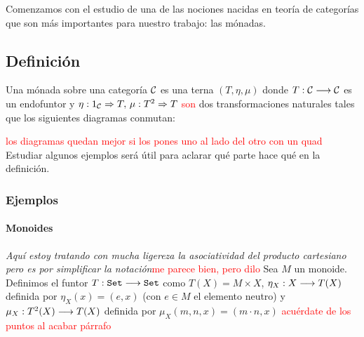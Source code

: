 Comenzamos con el estudio de una de las nociones nacidas
en teoría de categorías que son
más importantes para nuestro trabajo: las mónadas.


\subsection{Definición}
\begin{definition}
  Una mónada sobre una categoría $\mathcal{C}$
  es una terna $(T, \eta, \mu)$ donde $T : \mathcal{C}\longrightarrow \mathcal{C}$ es un
  endofuntor y $\eta : 1_{\mathcal{C}}\Rightarrow T, \, \mu: T^2\Rightarrow T$ \textcolor{red}{son} dos
  transformaciones naturales tales que los siguientes diagramas
  conmutan:


  \begin{center}

  \end{center}
\end{definition}

\textcolor{red}{los diagramas quedan mejor si los pones uno al lado del otro con un quad}
Estudiar algunos ejemplos será útil para aclarar qué parte hace qué
en la definición.

\subsubsection{Ejemplos}
\paragraph{Monoides}
\textit{Aquí estoy tratando con mucha ligereza la asociatividad del producto cartesiano pero es por simplificar la notación}\textcolor{red}{me parece bien, pero dilo}
Sea $M$ un monoide. Definimos el funtor $T : \texttt{Set}\longrightarrow \texttt{Set}$
como $T(X) = M\times X$, $\eta_X : X\longrightarrow T(X)$ definida
por $\eta_X(x) = (e, x)$ (con $e \in M$ el elemento neutro)
y $\mu_X : T^2(X)\longrightarrow T(X)$ definida por
$\mu_X(m, n, x) = (m\cdot n, x)$ \textcolor{red}{acuérdate de los puntos al acabar párrafo}


